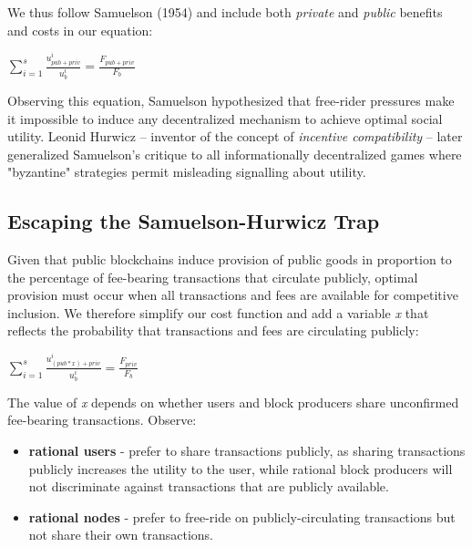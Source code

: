 \documentclass[oneside]{article}   	%
\begin{document}
We thus follow Samuelson (1954) and include both \textit{private} and \textit{public} benefits and costs in our equation:

\LARGE
\begin{adjustwidth}{1.5em}{1.5em} 
\begin{math}
\sum_{i=1}^{s} \frac{u_{{pub}+{priv}}^i}{u_b^i} = \frac{F_{{pub}+{priv}}}{F_b}
\end{math}
\end{adjustwidth}
\normalsize

Observing this equation, Samuelson hypothesized that free-rider pressures make it impossible to induce any decentralized mechanism to achieve optimal social utility. Leonid Hurwicz -- inventor of the concept of \textit{incentive compatibility} -- later generalized Samuelson's critique to all informationally decentralized games where "byzantine" strategies permit misleading signalling about utility.

\subsection*{Escaping the Samuelson-Hurwicz Trap}

Given that public blockchains induce provision of public goods in proportion to the percentage of fee-bearing transactions that circulate publicly, optimal provision must occur when all transactions and fees are available for competitive inclusion. We therefore simplify our cost function and add a variable \textit{x} that reflects the probability that transactions and fees are circulating publicly:

\LARGE
\begin{adjustwidth}{1.5em}{1.5em} 
\begin{math}
\sum_{i=1}^{s} \frac{u_{({pub}*{x})+{priv}}^i}{u_b^i} = \frac{F_{{priv}}}{F_b}
\end{math}
\end{adjustwidth}
\normalsize

The value of \textit{x} depends on whether users and block producers share unconfirmed fee-bearing transactions. Observe:

\begin{itemize}
  \item \textbf{rational users} - prefer to share transactions publicly, as sharing transactions publicly increases the utility to the user, while  rational block producers will not discriminate against transactions that are publicly available.
  \item \textbf{rational nodes} - prefer to free-ride on publicly-circulating transactions but not share their own transactions.
\end{itemize}
\end{document}
